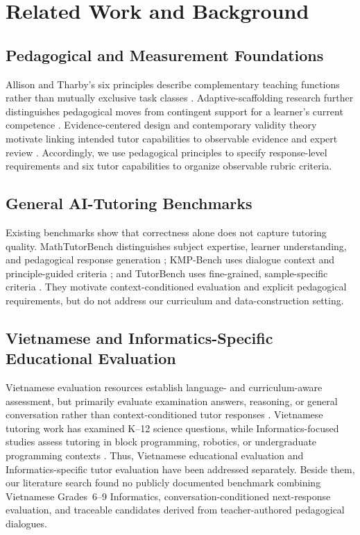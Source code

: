 \documentclass[conference]{IEEEtran}
\begin{document}
\section{Related Work and Background}

\subsection{Pedagogical and Measurement Foundations}

Allison and Tharby's six principles describe complementary teaching
functions rather than mutually exclusive task classes \cite{allison2015making}.
Adaptive-scaffolding research further distinguishes pedagogical moves from
contingent support for a learner's current competence \cite{vandepol2010scaffolding}.
Evidence-centered design and contemporary validity theory motivate linking
intended tutor capabilities to observable evidence and expert review
\cite{mislevy2003ecd,reeves2016validity}. Accordingly, we use pedagogical
principles to specify response-level requirements and six tutor capabilities
to organize observable rubric criteria.

\subsection{General AI-Tutoring Benchmarks}

Existing benchmarks show that correctness alone does not capture tutoring
quality. MathTutorBench distinguishes subject expertise, learner understanding,
and pedagogical response generation \cite{macina2025mathtutorbench}; KMP-Bench
uses dialogue context and principle-guided criteria \cite{shi2026kmpbench}; and
TutorBench uses fine-grained, sample-specific criteria
\cite{srinivasa2025tutorbench}. They motivate context-conditioned evaluation and explicit pedagogical requirements,
but do not address our curriculum and data-construction setting.

\subsection{Vietnamese and Informatics-Specific Educational Evaluation}

Vietnamese evaluation resources establish language- and curriculum-aware
assessment, but primarily evaluate examination answers, reasoning, or general
conversation rather than context-conditioned tutor responses
\cite{dao2023vnhsge,nguyen2024vimath,bui2025vmlu}. Vietnamese tutoring work
has examined K--12 science questions, while Informatics-focused studies assess
tutoring in block programming, robotics, or undergraduate programming
contexts \cite{nguyen2025vietnamtutor,lane2026cstutorbench,shin2026psychometric,jordan2024programming}.
Thus, Vietnamese educational evaluation and Informatics-specific tutor evaluation
have been addressed separately. Beside them, our literature search found no publicly
documented benchmark combining Vietnamese Grades~6--9 Informatics,
conversation-conditioned next-response evaluation, and traceable candidates
derived from teacher-authored pedagogical dialogues.
\end{document}
